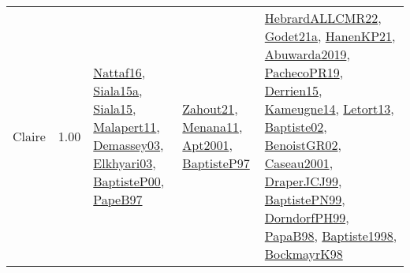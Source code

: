 {\begin{longtable}{p{3cm}r>{\raggedright\arraybackslash}p{6cm}>{\raggedright\arraybackslash}p{6cm}>{\raggedright\arraybackslash}p{8cm}}
\index{Claire}\index{CPSystems!Claire}Claire &  1.00 & \hyperref[detail:Nattaf16]{Nattaf16}, \hyperref[detail:Siala15a]{Siala15a}, \hyperref[detail:Siala15]{Siala15}, \hyperref[detail:Malapert11]{Malapert11}, \hyperref[detail:Demassey03]{Demassey03}, \hyperref[detail:Elkhyari03]{Elkhyari03}, \hyperref[detail:BaptisteP00]{BaptisteP00}, \hyperref[detail:PapeB97]{PapeB97} & \hyperref[detail:Zahout21]{Zahout21}, \hyperref[detail:Menana11]{Menana11}, \hyperref[detail:Apt2001]{Apt2001}, \hyperref[detail:BaptisteP97]{BaptisteP97} & \hyperref[detail:HebrardALLCMR22]{HebrardALLCMR22}, \hyperref[detail:Godet21a]{Godet21a}, \hyperref[detail:HanenKP21]{HanenKP21}, \hyperref[detail:Abuwarda2019]{Abuwarda2019}, \hyperref[detail:PachecoPR19]{PachecoPR19}, \hyperref[detail:Derrien15]{Derrien15}, \hyperref[detail:Kameugne14]{Kameugne14}, \hyperref[detail:Letort13]{Letort13}, \hyperref[detail:Baptiste02]{Baptiste02}, \hyperref[detail:BenoistGR02]{BenoistGR02}, \hyperref[detail:Caseau2001]{Caseau2001}, \hyperref[detail:DraperJCJ99]{DraperJCJ99}, \hyperref[detail:BaptistePN99]{BaptistePN99}, \hyperref[detail:DorndorfPH99]{DorndorfPH99}, \hyperref[detail:PapaB98]{PapaB98}, \hyperref[detail:Baptiste1998]{Baptiste1998}, \hyperref[detail:BockmayrK98]{BockmayrK98}\\

\end{longtable}}
